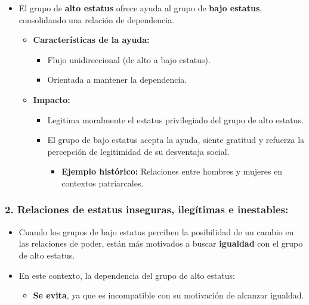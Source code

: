 \documentclass[
]{book}
\providecommand{\tightlist}{%
  \setlength{\itemsep}{0pt}\setlength{\parskip}{0pt}}
\begin{document}
\begin{itemize}
\tightlist
\item
  El grupo de \textbf{alto estatus} ofrece ayuda al grupo de \textbf{bajo estatus}, consolidando una relación de dependencia.

  \begin{itemize}
  \tightlist
  \item
    \textbf{Características de la ayuda:}

    \begin{itemize}
    \tightlist
    \item
      Flujo unidireccional (de alto a bajo estatus).
    \item
      Orientada a mantener la dependencia.\\
    \end{itemize}
  \item
    \textbf{Impacto:}

    \begin{itemize}
    \tightlist
    \item
      Legitima moralmente el estatus privilegiado del grupo de alto estatus.
    \item
      El grupo de bajo estatus acepta la ayuda, siente gratitud y refuerza la percepción de legitimidad de su desventaja social.

      \begin{itemize}
      \tightlist
      \item
        \textbf{Ejemplo histórico:} Relaciones entre hombres y mujeres en contextos patriarcales.
      \end{itemize}
    \end{itemize}
  \end{itemize}
\end{itemize}

\subsubsection{\texorpdfstring{\textbf{2. Relaciones de estatus inseguras, ilegítimas e inestables:}}{2. Relaciones de estatus inseguras, ilegítimas e inestables:}}\label{relaciones-de-estatus-inseguras-ileguxedtimas-e-inestables}

\begin{itemize}
\tightlist
\item
  Cuando los grupos de bajo estatus perciben la posibilidad de un cambio en las relaciones de poder, están más motivados a buscar \textbf{igualdad} con el grupo de alto estatus.
\item
  En este contexto, la dependencia del grupo de alto estatus:

  \begin{itemize}
  \tightlist
  \item
    \textbf{Se evita}, ya que es incompatible con su motivación de alcanzar igualdad.
  \end{itemize}
\end{itemize}
\end{document}
